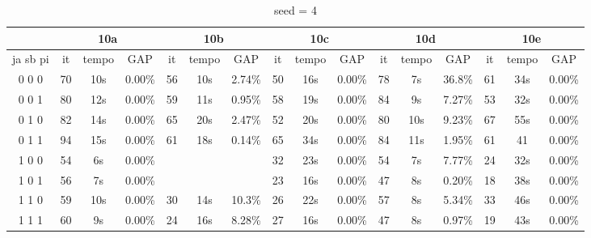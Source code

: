 \documentclass[12pt]{article}
\begin{document}
\begin{table}[!htb]
\centering
\footnotesize
\begin{tabular}{|c||c|c|c||c|c|c||c|c|c||c|c|c||c|c|c|}
\cline{2-16}
\multicolumn{1}{c||}{} & \multicolumn{3}{c||}{10a} & \multicolumn{3}{c||}{10b} & \multicolumn{3}{c||}{10c} & \multicolumn{3}{c||}{10d} & \multicolumn{3}{c|}{10e}\\
\hline
ja sb pi & it & tempo & GAP & it & tempo & GAP & it & tempo & GAP & it & tempo & GAP & it & tempo & GAP \\
\hline
0 0 0 & 70 & 10s & 0.00\% & 56 & 10s & 2.74\% & 50 & 16s & 0.00\% & 78 & 7s & 36.8\% & 61 & 34s & 0.00\% \\
0 0 1 & 80 & 12s & 0.00\% & 59 & 11s & 0.95\% & 58 & 19s & 0.00\% & 84 & 9s & 7.27\% & 53 & 32s & 0.00\% \\
0 1 0 & 82 & 14s & 0.00\% & 65 & 20s & 2.47\% & 52 & 20s & 0.00\% & 80 & 10s & 9.23\% & 67 & 55s & 0.00\% \\
0 1 1 & 94 & 15s & 0.00\% & 61 & 18s & 0.14\% & 65 & 34s & 0.00\% & 84 & 11s & 1.95\% & 61 & 41 & 0.00\% \\
1 0 0 & 54 & 6s & 0.00\% &  &  &              & 32 & 23s & 0.00\% & 54 & 7s & 7.77\% & 24 & 32s & 0.00\% \\
1 0 1 & 56 & 7s & 0.00\% &  &  &              & 23 & 16s & 0.00\% & 47 & 8s & 0.20\% & 18 & 38s & 0.00\% \\
1 1 0 & 59 & 10s & 0.00\% & 30 & 14s & 10.3\% & 26 & 22s & 0.00\% & 57 & 8s & 5.34\% & 33 & 46s & 0.00\% \\
1 1 1 & 60 & 9s & 0.00\% & 24 & 16s & 8.28\% & 27 & 16s & 0.00\% & 47 & 8s & 0.97\% & 19 & 43s & 0.00\% \\
\hline
\end{tabular}
\caption{seed = 4}
\end{table}
\end{document}
